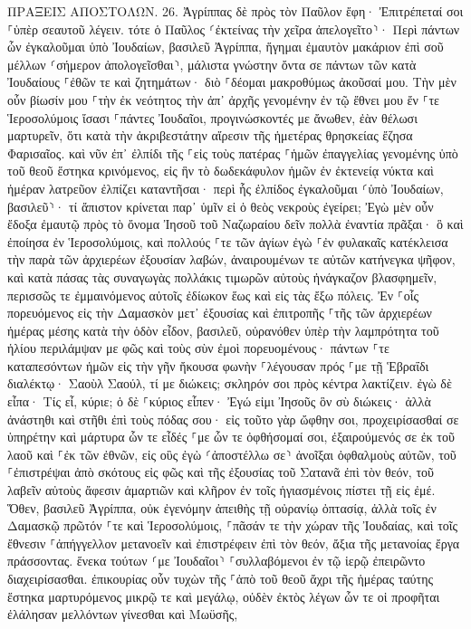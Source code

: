 \documentclass[twoside, 9pt]{extreport}
\begin{document}
ΠΡΑΞΕΙΣ ΑΠΟΣΤΟΛΩΝ.
26.
Ἀγρίππας δὲ πρὸς τὸν Παῦλον ἔφη· Ἐπιτρέπεταί σοι ⸀ὑπὲρ σεαυτοῦ λέγειν. τότε ὁ Παῦλος ⸂ἐκτείνας τὴν χεῖρα ἀπελογεῖτο⸃· 
Περὶ πάντων ὧν ἐγκαλοῦμαι ὑπὸ Ἰουδαίων, βασιλεῦ Ἀγρίππα, ἥγημαι ἐμαυτὸν μακάριον ἐπὶ σοῦ μέλλων ⸂σήμερον ἀπολογεῖσθαι⸃, 
μάλιστα γνώστην ὄντα σε πάντων τῶν κατὰ Ἰουδαίους ⸀ἐθῶν τε καὶ ζητημάτων· διὸ ⸀δέομαι μακροθύμως ἀκοῦσαί μου. 
Τὴν μὲν οὖν βίωσίν μου ⸀τὴν ἐκ νεότητος τὴν ἀπ᾽ ἀρχῆς γενομένην ἐν τῷ ἔθνει μου ἔν ⸀τε Ἱεροσολύμοις ἴσασι ⸀πάντες Ἰουδαῖοι, 
προγινώσκοντές με ἄνωθεν, ἐὰν θέλωσι μαρτυρεῖν, ὅτι κατὰ τὴν ἀκριβεστάτην αἵρεσιν τῆς ἡμετέρας θρησκείας ἔζησα Φαρισαῖος. 
καὶ νῦν ἐπ᾽ ἐλπίδι τῆς ⸀εἰς τοὺς πατέρας ⸀ἡμῶν ἐπαγγελίας γενομένης ὑπὸ τοῦ θεοῦ ἕστηκα κρινόμενος, 
εἰς ἣν τὸ δωδεκάφυλον ἡμῶν ἐν ἐκτενείᾳ νύκτα καὶ ἡμέραν λατρεῦον ἐλπίζει καταντῆσαι· περὶ ἧς ἐλπίδος ἐγκαλοῦμαι ⸂ὑπὸ Ἰουδαίων, βασιλεῦ⸃· 
τί ἄπιστον κρίνεται παρ᾽ ὑμῖν εἰ ὁ θεὸς νεκροὺς ἐγείρει; 
Ἐγὼ μὲν οὖν ἔδοξα ἐμαυτῷ πρὸς τὸ ὄνομα Ἰησοῦ τοῦ Ναζωραίου δεῖν πολλὰ ἐναντία πρᾶξαι· 
ὃ καὶ ἐποίησα ἐν Ἱεροσολύμοις, καὶ πολλούς ⸀τε τῶν ἁγίων ἐγὼ ⸀ἐν φυλακαῖς κατέκλεισα τὴν παρὰ τῶν ἀρχιερέων ἐξουσίαν λαβών, ἀναιρουμένων τε αὐτῶν κατήνεγκα ψῆφον, 
καὶ κατὰ πάσας τὰς συναγωγὰς πολλάκις τιμωρῶν αὐτοὺς ἠνάγκαζον βλασφημεῖν, περισσῶς τε ἐμμαινόμενος αὐτοῖς ἐδίωκον ἕως καὶ εἰς τὰς ἔξω πόλεις. 
Ἐν ⸀οἷς πορευόμενος εἰς τὴν Δαμασκὸν μετ᾽ ἐξουσίας καὶ ἐπιτροπῆς ⸀τῆς τῶν ἀρχιερέων 
ἡμέρας μέσης κατὰ τὴν ὁδὸν εἶδον, βασιλεῦ, οὐρανόθεν ὑπὲρ τὴν λαμπρότητα τοῦ ἡλίου περιλάμψαν με φῶς καὶ τοὺς σὺν ἐμοὶ πορευομένους· 
πάντων ⸀τε καταπεσόντων ἡμῶν εἰς τὴν γῆν ἤκουσα φωνὴν ⸀λέγουσαν πρός ⸀με τῇ Ἑβραΐδι διαλέκτῳ· Σαοὺλ Σαούλ, τί με διώκεις; σκληρόν σοι πρὸς κέντρα λακτίζειν. 
ἐγὼ δὲ εἶπα· Τίς εἶ, κύριε; ὁ δὲ ⸀κύριος εἶπεν· Ἐγώ εἰμι Ἰησοῦς ὃν σὺ διώκεις· 
ἀλλὰ ἀνάστηθι καὶ στῆθι ἐπὶ τοὺς πόδας σου· εἰς τοῦτο γὰρ ὤφθην σοι, προχειρίσασθαί σε ὑπηρέτην καὶ μάρτυρα ὧν τε εἶδές ⸀με ὧν τε ὀφθήσομαί σοι, 
ἐξαιρούμενός σε ἐκ τοῦ λαοῦ καὶ ⸀ἐκ τῶν ἐθνῶν, εἰς οὓς ἐγὼ ⸂ἀποστέλλω σε⸃ 
ἀνοῖξαι ὀφθαλμοὺς αὐτῶν, τοῦ ⸀ἐπιστρέψαι ἀπὸ σκότους εἰς φῶς καὶ τῆς ἐξουσίας τοῦ Σατανᾶ ἐπὶ τὸν θεόν, τοῦ λαβεῖν αὐτοὺς ἄφεσιν ἁμαρτιῶν καὶ κλῆρον ἐν τοῖς ἡγιασμένοις πίστει τῇ εἰς ἐμέ. 
Ὅθεν, βασιλεῦ Ἀγρίππα, οὐκ ἐγενόμην ἀπειθὴς τῇ οὐρανίῳ ὀπτασίᾳ, 
ἀλλὰ τοῖς ἐν Δαμασκῷ πρῶτόν ⸀τε καὶ Ἱεροσολύμοις, ⸀πᾶσάν τε τὴν χώραν τῆς Ἰουδαίας, καὶ τοῖς ἔθνεσιν ⸀ἀπήγγελλον μετανοεῖν καὶ ἐπιστρέφειν ἐπὶ τὸν θεόν, ἄξια τῆς μετανοίας ἔργα πράσσοντας. 
ἕνεκα τούτων ⸂με Ἰουδαῖοι⸃ ⸀συλλαβόμενοι ἐν τῷ ἱερῷ ἐπειρῶντο διαχειρίσασθαι. 
ἐπικουρίας οὖν τυχὼν τῆς ⸀ἀπὸ τοῦ θεοῦ ἄχρι τῆς ἡμέρας ταύτης ἕστηκα μαρτυρόμενος μικρῷ τε καὶ μεγάλῳ, οὐδὲν ἐκτὸς λέγων ὧν τε οἱ προφῆται ἐλάλησαν μελλόντων γίνεσθαι καὶ Μωϋσῆς, 
\end{document}
